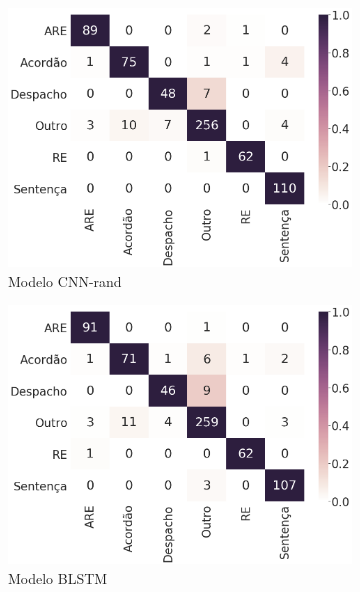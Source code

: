 \begin{figure}[ht]
    \centering
    \begin{subfigure}[b]{0.45\textwidth}
        \includegraphics[width=\textwidth]{figuras/matrizCNN}
        \caption{Modelo CNN-rand}
        \label{fig:matrizCNN}
    \end{subfigure}\hfill
    \begin{subfigure}[b]{0.45\textwidth}
        \includegraphics[width=\textwidth]{figuras/matrizBLSTM}
        \caption{Modelo BLSTM}
        \label{fig:matrizBLSTM}
    \end{subfigure}\hfill
    \begin{subfigure}[b]{0.45\textwidth}

\end{subfigure}
\end{figure}
